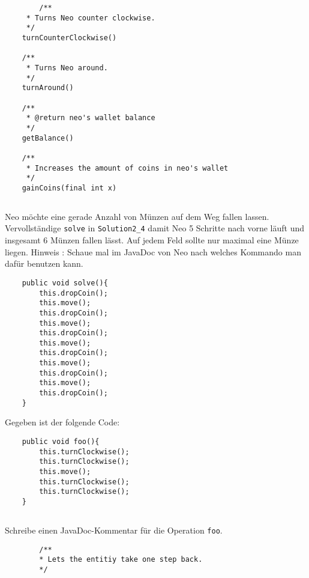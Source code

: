 \begin{questions}
\begin{solution}
\begin{lstlisting}
        /**
     * Turns Neo counter clockwise.
     */
    turnCounterClockwise()

    /**
     * Turns Neo around.
     */
    turnAround()

    /**
     * @return neo's wallet balance
     */
    getBalance()

    /**
     * Increases the amount of coins in neo's wallet
     */
    gainCoins(final int x)
    \end{lstlisting}
    \end{solution}
    \begin{parts}
    \setcounter{partno}{3}
    \part{}
    Neo möchte eine gerade Anzahl von Münzen auf dem Weg fallen lassen. Vervollständige \texttt{solve} in \texttt{Solution2\_4} damit Neo 5 Schritte nach vorne läuft und insgesamt 6 Münzen fallen lässt.
    Auf jedem Feld sollte nur maximal eine Münze liegen.
    \newline Hinweis : Schaue mal im JavaDoc von Neo nach welches Kommando man dafür benutzen kann.
    \end{parts}
    \begin{solution}
    \begin{lstlisting}
    public void solve(){
        this.dropCoin();
        this.move();
        this.dropCoin();
        this.move();
        this.dropCoin();
        this.move();
        this.dropCoin();
        this.move();
        this.dropCoin();
        this.move();
        this.dropCoin();
    }
    \end{lstlisting}
    \end{solution}
    Gegeben ist der folgende Code:
    \begin{lstlisting}
    public void foo(){
        this.turnClockwise();
        this.turnClockwise();
        this.move();
        this.turnClockwise();
        this.turnClockwise();
    }
    \end{lstlisting}
    \begin{parts}
    \setcounter{partno}{4}
    \part{} Schreibe einen JavaDoc-Kommentar für die Operation \texttt{foo}.
    \begin{solution}
        \begin{lstlisting}
        /**
        * Lets the entitiy take one step back.
        */
        \end{lstlisting}
    \end{solution}

\end{parts}
\end{questions}
